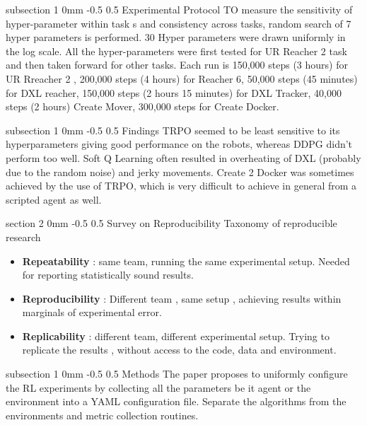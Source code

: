 \documentclass[twocolumn,11pt]{article}
\makeatletter
\renewcommand{\section}{\@startsection
{section}%
{2}%
{0mm}%
{-0.5\baselineskip}%
{0.5\baselineskip}%
{\bfseries\color{blue}}} %
\renewcommand{\subsection}{\@startsection
{subsection}%
{1}%
{0mm}%
{-0.5\baselineskip}%
{0.5\baselineskip}%
{\bfseries\color{blue}}} %
\makeatother
\begin{document}
\subsection{Experimental Protocol}
TO measure the  sensitivity  of hyper-parameter within task s and  consistency across tasks, random search of 7 hyper parameters is  performed. 30 Hyper parameters were drawn uniformly in the log scale. All the hyper-parameters were first tested for  UR Reacher 2 task and then  taken forward for other tasks.
Each run is 150,000 steps (3 hours)  for  UR Rreacher 2 , 200,000 steps (4 hours)  for Reacher 6, 50,000  steps  (45 minutes) for DXL reacher, 150,000 steps (2 hours 15 minutes)  for DXL  Tracker, 40,000 steps (2  hours) Create Mover,  300,000  steps for Create Docker.

\subsection{Findings}
TRPO seemed to be least  sensitive to its hyperparameters giving good performance on the robots, whereas DDPG didn't perform  too well. Soft Q Learning often resulted in overheating of  DXL (probably due  to the random noise) and jerky movements. Create 2 Docker was  sometimes achieved by  the use  of  TRPO,  which is very difficult to achieve in general from a scripted agent as well. 

\section{Survey  on  Reproducibility}
Taxonomy of reproducible research 
\begin{itemize}
\item \textbf{Repeatability } : same team, running the same experimental setup.  Needed for reporting statistically sound results. 
\item \textbf{Reproducibility} : Different team , same setup , achieving results within marginals of  experimental error. 
\item \textbf{Replicability} : different  team, different experimental  setup. Trying to replicate the results  , without access to the code, data and  environment.

\end{itemize}
\subsection{Methods}
The paper  proposes to uniformly configure the RL  experiments by collecting  all the parameters be it agent or the environment into a YAML configuration file. Separate the  algorithms from the environments and  metric collection routines.  
\end{document}
